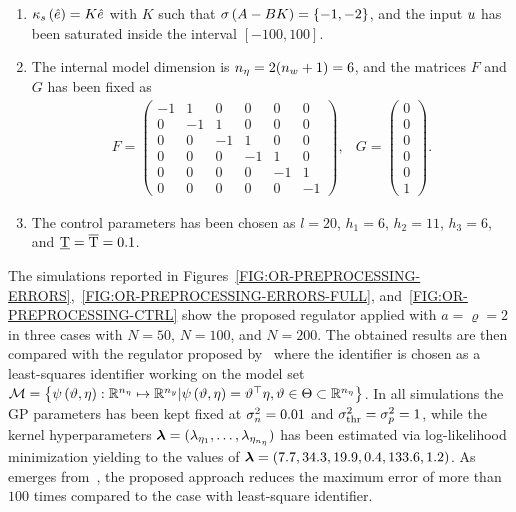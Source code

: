\begin{enumerate}
   \item $\kappa_s \left( \hat{e} \right) = K \hat{e}$ with $K$ such that $\sigma \left( A - BK \right) = \{-1, -2\}$, and the input $u$ has been saturated inside the interval $[-100, 100]$.
   \item The internal model dimension is $n_{\eta} = 2(n_{w}+1) = 6$, and the matrices $F$ and $G$ has been fixed as
   \begin{equation*}
      \begin{matrix}
         F =
         \begin{pmatrix}
            -1 & 1 & 0 & 0 & 0 & 0 \\
            0 & -1 & 1 & 0 & 0 & 0 \\
            0 & 0 & -1 & 1 & 0 & 0 \\
            0 & 0 & 0 & -1 & 1 & 0 \\
            0 & 0 & 0 & 0 & -1 & 1 \\
            0 & 0 & 0 & 0 & 0 & -1
         \end{pmatrix}, &
         G = 
         \begin{pmatrix}
            0 \\ 0 \\ 0 \\ 0 \\ 0 \\ 1
         \end{pmatrix}.
      \end{matrix}
   \end{equation*}
   \item The control parameters has been chosen as $l = 20$, $h_1 = 6$, $h_2 = 11$, $h_3 = 6$, and $\underline{\text{T}} = \overline{\text{T}} = 0.1$.
\end{enumerate}
The simulations reported in Figures~\ref{FIG:OR-PREPROCESSING-ERRORS},~\ref{FIG:OR-PREPROCESSING-ERRORS-FULL}, and~\ref{FIG:OR-PREPROCESSING-CTRL} show the proposed regulator applied
with $a = \varrho = 2$ in three cases with $N = 50$, $N = 100$, and $N = 200$. The obtained results are then compared with the regulator proposed
by~\cite{bin2020approximate} where the identifier is chosen as a least-squares identifier working on the model set
$\mathcal{M} = \left\{ \psi \left( \vartheta, \eta \right): \mathbb{R}^{n_{\eta}} \mapsto \mathbb{R}^{n_{y}} | \psi \left( \vartheta, \eta \right) = \vartheta^{\top}\eta, \vartheta \in \Theta \subset \mathbb{R}^{n_{\eta}} \right\}$.
In all simulations the GP parameters has been kept fixed at $\sigma_n^2 = 0.01$ and $\sigma^2_{\text{thr}} = \sigma_p^2 = 1$, while the kernel hyperparameters
$\boldsymbol{\lambda} = (\lambda_{\eta_{1}}, \dots, \lambda_{\eta_{n_{\eta}}})$ has been estimated via log-likelihood minimization \cite{rasmussen2003gaussian}
yielding to the values of $\boldsymbol{\lambda} = \left( 7.7, 34.3, 19.9, 0.4, 133.6, 1.2 \right)$. As emerges from~, the proposed approach
reduces the maximum error of more than $100$ times compared to the case with least-square identifier.

